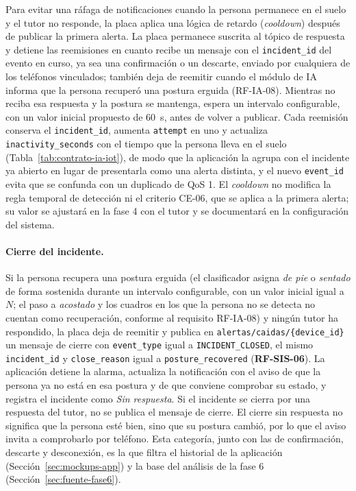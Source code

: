 \documentclass[12pt,a4paper,oneside]{book}
\theoremstyle{plain}
\theoremstyle{definition}
\theoremstyle{remark}
\begin{document}
Para evitar una ráfaga de notificaciones cuando la persona permanece en el suelo y el tutor no responde, la placa aplica una lógica de retardo (\textit{cooldown}) después de publicar la primera alerta. La placa permanece suscrita al tópico de respuesta y detiene las reemisiones en cuanto recibe un mensaje con el \texttt{incident\_id} del evento en curso, ya sea una confirmación o un descarte, enviado por cualquiera de los teléfonos vinculados; también deja de reemitir cuando el módulo de IA informa que la persona recuperó una postura erguida (RF-IA-08). Mientras no reciba esa respuesta y la postura se mantenga, espera un intervalo configurable, con un valor inicial propuesto de 60~s, antes de volver a publicar. Cada reemisión conserva el \texttt{incident\_id}, aumenta \texttt{attempt} en uno y actualiza \texttt{inactivity\_seconds} con el tiempo que la persona lleva en el suelo (Tabla~\ref{tab:contrato-ia-iot}), de modo que la aplicación la agrupa con el incidente ya abierto en lugar de presentarla como una alerta distinta, y el nuevo \texttt{event\_id} evita que se confunda con un duplicado de QoS 1. El \textit{cooldown} no modifica la regla temporal de detección ni el criterio CE-06, que se aplica a la primera alerta; su valor se ajustará en la fase 4 con el tutor y se documentará en la configuración del sistema.

\paragraph{Cierre del incidente.} Si la persona recupera una postura erguida (el clasificador asigna \textit{de pie} o \textit{sentado} de forma sostenida durante un intervalo configurable, con un valor inicial igual a $N$; el paso a \textit{acostado} y los cuadros en los que la persona no se detecta no cuentan como recuperación, conforme al requisito RF-IA-08) y ningún tutor ha respondido, la placa deja de reemitir y publica en \texttt{alertas/caidas/\{device\_id\}} un mensaje de cierre con \texttt{event\_type} igual a \texttt{INCIDENT\_CLOSED}, el mismo \texttt{incident\_id} y \texttt{close\_reason} igual a \texttt{posture\_recovered} (\textbf{RF-SIS-06}). La aplicación detiene la alarma, actualiza la notificación con el aviso de que la persona ya no está en esa postura y de que conviene comprobar su estado, y registra el incidente como \textit{Sin respuesta}. Si el incidente se cierra por una respuesta del tutor, no se publica el mensaje de cierre. El cierre sin respuesta no significa que la persona esté bien, sino que su postura cambió, por lo que el aviso invita a comprobarlo por teléfono. Esta categoría, junto con las de confirmación, descarte y desconexión, es la que filtra el historial de la aplicación (Sección~\ref{sec:mockups-app}) y la base del análisis de la fase 6 (Sección~\ref{sec:fuente-fase6}).
\end{document}
